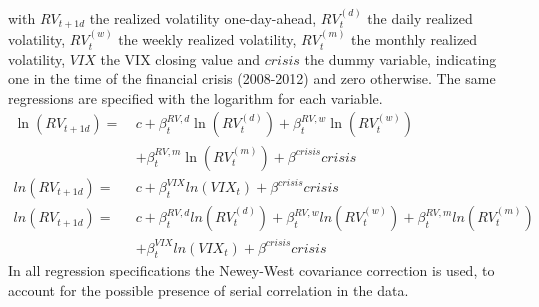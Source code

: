with $RV_{t+1d}$ the realized volatility one-day-ahead, $RV^{(d)}_{t}$ the daily realized volatility, $RV^{(w)}_{t}$ the weekly realized volatility, $RV^{(m)}_{t}$ the monthly realized volatility, $VIX$ the \ac{VIX} closing value and $crisis$ the dummy variable, indicating one in the time of the financial crisis (2008-2012) and zero otherwise. The same regressions are specified with the logarithm for each variable.
\begin{align}
\ln(RV_{t+1d}) = \ &c + \beta^{RV,d}_{t} \ln(RV^{(d)}_{t}) + \beta^{RV,w}_{t} \ln(RV^{(w)}_{t}) \nonumber \\
& + \beta^{RV,m}_{t} \ln(RV^{(m)}_{t}) + \beta^{crisis} crisis  \tag{Reg1b}  \label{eq:Reg1b}\\
ln(RV_{t+1d}) =  \ &c + \beta^{VIX}_{t} ln(VIX_{t}) + \beta^{crisis} crisis  \tag{Reg2b}  \label{eq:Reg2b}\\
ln(RV_{t+1d}) = \ &c + \beta^{RV,d}_{t} ln(RV^{(d)}_{t}) + \beta^{RV,w}_{t} ln(RV^{(w)}_{t}) + \beta^{RV,m}_{t} ln(RV^{(m)}_{t}) \nonumber \\
& + \beta^{VIX}_{t} ln(VIX_{t})+ \beta^{crisis} crisis  \tag{Reg3b}  \label{eq:Reg3b}
\end{align}
In all regression specifications the Newey-West covariance correction is used, to account for the possible presence of serial correlation in the data.

